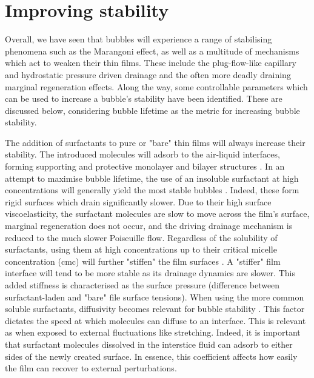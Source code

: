 \documentclass[a4paper,12pt]{article}
\numberwithin{equation}{section}
\numberwithin{figure}{section}
\numberwithin{table}{section}
\begin{document}
\section{Improving stability}
Overall, we have seen that bubbles will experience a range of stabilising phenomena such as the Marangoni effect, as well as a multitude of mechanisms which act to weaken their thin films. These include the plug-flow-like capillary and hydrostatic pressure driven drainage and the often more deadly draining marginal regeneration effects. Along the way, some controllable parameters which can be used to increase a bubble's stability have been identified. These are discussed below, considering bubble lifetime as the metric for increasing bubble stability.

The addition of surfactants to pure or "bare" thin films will always increase their stability. The introduced molecules will adsorb to the air-liquid interfaces, forming supporting and protective monolayer and bilayer structures \cite{Gast1997, Mysels1968Nomenclature}. In an attempt to maximise bubble lifetime, the use of an insoluble surfactant at high concentrations will generally yield the most stable bubbles \cite{Petit2015, ChampougnyNotBare2016, Bhamla2017}. Indeed, these form rigid surfaces which drain significantly slower. Due to their high surface viscoelasticity, the surfactant molecules are slow to move across the film's surface, marginal regeneration does not occur, and the driving drainage mechanism is reduced to the much slower Poiseuille flow. Regardless of the solubility of surfactants, using them at high concentrations up to their critical micelle concentration (cmc) will further "stiffen" the film surfaces \cite{Bhamla2017}. A "stiffer" film interface will tend to be more stable as its drainage dynamics are slower. This added stiffness is characterised as the surface pressure (difference between surfactant-laden and "bare" file surface tensions). When using the more common soluble surfactants, diffusivity becomes relevant for bubble stability \cite{deGennesYoung2001}. This factor dictates the speed at which molecules can diffuse to an interface. This is relevant as when exposed to external fluctuations like stretching. Indeed, it is important that surfactant molecules dissolved in the interstice fluid can adsorb to either sides of the newly created surface. In essence, this coefficient affects how easily the film can recover to external perturbations.
\end{document}
